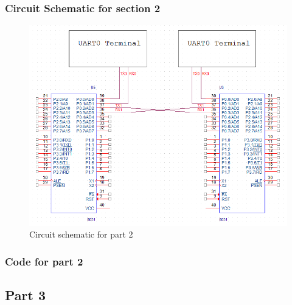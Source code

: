 \documentclass[12pt]{article}
\begin{document}
	\subsubsection{Circuit Schematic for section 2}
		\begin{figure}[H]
			\centering
			\includegraphics[width=\textwidth]{Part2Schematic.png}
			\caption{Circuit schematic for part 2}
			\label{schematic2}
		\end{figure} 
		\pagebreak
	\subsubsection{Code for part 2}
			

\subsection{Part 3}
\end{document}
